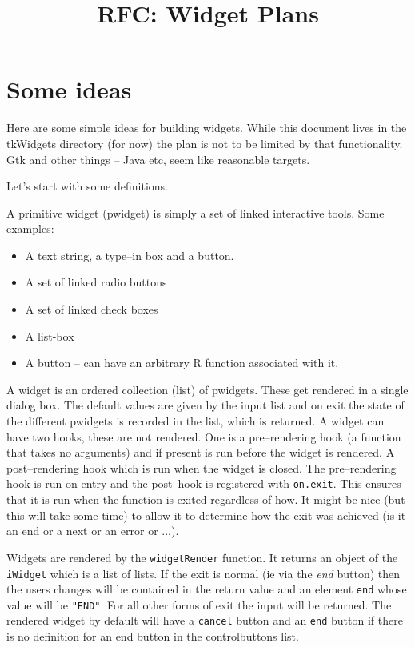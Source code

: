 \documentclass{article}
\begin{document}
\title{RFC: Widget Plans}
\maketitle


\section*{Some ideas}

Here are some simple ideas for building widgets. While this document
lives in the tkWidgets directory (for now) the plan is not to be
limited by that functionality. Gtk and other things -- Java etc,
seem like reasonable targets.

Let's start with some definitions.

A primitive widget (pwidget) is simply a set of linked interactive
tools.
Some examples:
\begin{itemize}
\item A text string, a type--in box and a button.
\item A set of linked radio buttons
\item A set of linked check boxes
\item A list-box
\item A button -- can have an arbitrary R function associated with it.
\end{itemize}

A widget is an ordered collection (list) of pwidgets.
These get rendered in a single dialog box.
The default values are given by the input list and on exit the state
of the different pwidgets is recorded in the list, which is returned.
A widget can have two hooks, these are not rendered. One is a
pre--rendering hook (a function that takes no arguments) and if
present is run before the widget is rendered.
A post--rendering hook which is run when the widget is closed.
The pre--rendering hook is run on entry and the post--hook is registered with 
\verb+on.exit+. This ensures that it is run when the function is
exited regardless of how. 
It might be nice (but this will take some time) to allow it to
determine how the exit was achieved (is it an end
or a next or an error or ...).

Widgets are rendered by the \verb+widgetRender+ function.
It returns an object of the \verb+iWidget+ which is a list of
lists. If the exit is normal (ie via the {\em end} button) then the
users changes will be contained in the return value and an element
{\tt end} whose value will be {\tt "END"}. 
For all other forms of exit the input
will be returned. The rendered widget by default will have a
\verb+cancel+ button and an \verb+end+ button if there is no
definition for an end button in the controlbuttons list. 
\end{document}
